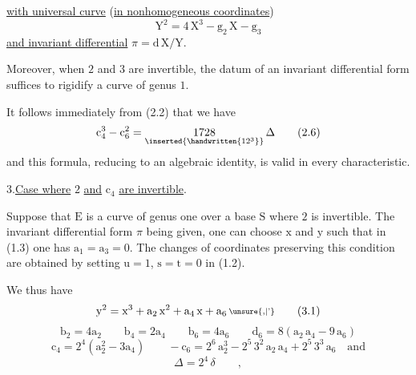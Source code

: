 \uline{with universal curve} (\uline{in nonhomogeneous coordinates})
\[
\mathrm{Y}^{2}=4\,\mathrm{X}^{3}-\mathrm{g}_{2}\,\mathrm{X}-\mathrm{g}_{3}
\]
\uline{and invariant differential} $\pi=\mathrm{d}\,\mathrm{X}/\mathrm{Y}$.

Moreover, when $2$ and $3$ are invertible, the datum of an invariant differential form suffices to rigidify a curve of genus $1$.

It follows immediately from (2.2) that we have
\[
\mathrm{c}_{4}^{3}-\mathrm{c}_{6}^{2}=\underset{\inserted{\handwritten{12^{3}}}}{1728}\,\Delta
\tag*{(2.6)}
\]
and this formula, reducing to an algebraic identity, is valid in every characteristic.

3.\qquad \uline{Case where} $2$ \uline{and} $\mathrm{c}_{4}$ \uline{are invertible}.

Suppose that $\mathrm{E}$ is a curve of genus one over a base $\mathrm{S}$ where $2$ is invertible. The invariant differential form $\pi$ being given, one can choose $\mathrm{x}$ and $\mathrm{y}$ such that in (1.3) one has $\mathrm{a}_{1}=\mathrm{a}_{3}=0$. The changes of coordinates preserving this condition are obtained by setting $\mathrm{u}=1$, $\mathrm{s}=\mathrm{t}=0$ in (1.2).

We thus have
\[
\mathrm{y}^{2}=\mathrm{x}^{3}+\mathrm{a}_{2}\,\mathrm{x}^{2}+\mathrm{a}_{4}\,\mathrm{x}+\mathrm{a}_{6}\,\raisebox{.14ex}{\scriptsize\unsure{,|'}}
\tag*{(3.1)}
\]
\[
\mathrm{b}_{2}=4\mathrm{a}_{2}\qquad\mathrm{b}_{4}=2\mathrm{a}_{4}\qquad
\mathrm{b}_{6}=4\mathrm{a}_{6}\qquad\mathrm{d}_{6}=8(\mathrm{a}_{2}\,\mathrm{a}_{4}-9\,\mathrm{a}_{6})
\]
\[
\mathrm{c}_{4}=2^{4}(\mathrm{a}_{2}^{2}-3\mathrm{a}_{4})\qquad
-\mathrm{c}_{6}=2^{6}\,\mathrm{a}_{2}^{3}-2^{5}\,3^{2}\,\mathrm{a}_{2}\,\mathrm{a}_{4}+2^{5}\,3^{3}\,\mathrm{a}_{6}\quad\text{and}
\tag*{(3.2)}
\]
\[
\Delta=2^{4}\,\delta\qquad,
\]
\clearpage
